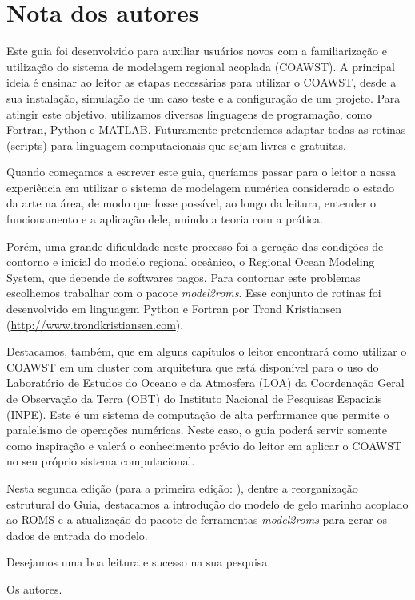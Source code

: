 \chapter*{Nota dos autores}

\noindent Este guia foi desenvolvido para auxiliar usuários novos com a familiarização e utilização do sistema 
          de modelagem regional acoplada (COAWST). A principal ideia é ensinar ao leitor as etapas necessárias 
          para utilizar o COAWST, desde a sua instalação, simulação de um caso teste e a configuração de um 
          projeto. Para atingir este objetivo, utilizamos diversas linguagens de programação, como Fortran, 
          Python e MATLAB. Futuramente pretendemos adaptar todas as rotinas (scripts) para linguagem computacionais 
          que sejam livres e gratuitas.
\bigskip

\noindent Quando começamos a escrever este guia, queríamos passar para o leitor a nossa experiência em utilizar o 
          sistema de modelagem numérica considerado o estado da arte na área, de modo que fosse possível, ao longo 
          da leitura, entender o funcionamento e a aplicação dele, unindo a teoria com a prática.
\bigskip

\noindent Porém, uma grande dificuldade neste processo foi a geração das condições de contorno e inicial do modelo 
          regional oceânico, o Regional Ocean Modeling System, que depende de softwares pagos. Para contornar este 
          problemas escolhemos trabalhar com o pacote \textit{model2roms}. Esse conjunto de rotinas foi desenvolvido 
          em linguagem Python e Fortran por Trond Kristiansen 
          (\textcolor{bleu_cite}{\href{http://www.trondkristiansen.com}{http://www.trondkristiansen.com}}).
\bigskip

\noindent Destacamos, também, que em alguns capítulos o leitor encontrará como utilizar o COAWST em um cluster com
          arquitetura que está disponível para o uso do Laboratório de Estudos do Oceano e da Atmosfera (LOA) da Coordenação
          Geral de Observação da Terra (OBT) do Instituto Nacional de Pesquisas Espaciais (INPE). Este é um sistema de 
          computação de alta performance que permite o paralelismo de operações numéricas. Neste caso, o guia poderá servir 
          somente como inspiração e valerá o conhecimento prévio do leitor em aplicar o COAWST no seu próprio sistema computacional.
\bigskip

\noindent Nesta segunda edição (para a primeira edição: \cite{Sutil2018}), dentre a reorganização estrutural do Guia, destacamos a introdução do modelo
          de gelo marinho acoplado ao ROMS e a atualização do pacote de ferramentas \textit{model2roms} para gerar os 
          dados de entrada do modelo.
\bigskip

\noindent Desejamos uma boa leitura e sucesso na sua pesquisa.
\begin{flushright}
\noindent Os autores.
\end{flushright}
